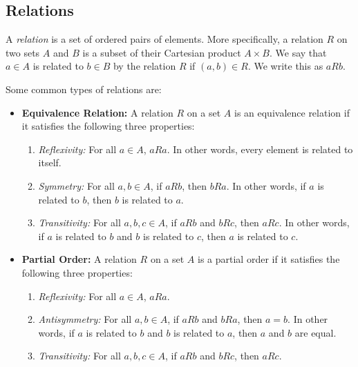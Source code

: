 \documentclass{report}
\begin{document}
\subsection{Relations}

A \textit{relation} is a set of ordered pairs of elements. More specifically, a relation $R$ on two sets $A$ and $B$ is a subset of their Cartesian product $A \times B$. We say that $a \in A$ is related to $b \in B$ by the relation $R$ if $(a, b) \in R$. We write this as $aRb$.

Some common types of relations are:

\begin{itemize} 

\item \textbf{Equivalence Relation:} A relation $R$ on a set $A$ is an equivalence relation if it satisfies the following three properties: 

\begin{enumerate} 

    \item \textit{Reflexivity:} For all $a \in A$, $aRa$. In other words, every element is related to itself. 
    
    \item \textit{Symmetry:} For all $a, b \in A$, if $aRb$, then $bRa$. In other words, if $a$ is related to $b$, then $b$ is related to $a$. 
    
    \item \textit{Transitivity:} For all $a, b, c \in A$, if $aRb$ and $bRc$, then $aRc$. In other words, if $a$ is related to $b$ and $b$ is related to $c$, then $a$ is related to $c$. 
\end{enumerate}


\item \textbf{Partial Order:} A relation $R$ on a set $A$ is a partial order if it satisfies the following three properties: 
    \begin{enumerate} 
        
        \item \textit{Reflexivity:} For all $a \in A$, $aRa$. 
        
        \item \textit{Antisymmetry:} For all $a, b \in A$, if $aRb$ and $bRa$, then $a = b$. In other words, if $a$ is related to $b$ and $b$ is related to $a$, then $a$ and $b$ are equal. 
        
        \item \textit{Transitivity:} For all $a, b, c \in A$, if $aRb$ and $bRc$, then $aRc$. 
        \end{enumerate} 

    \end{itemize}
\end{document}
